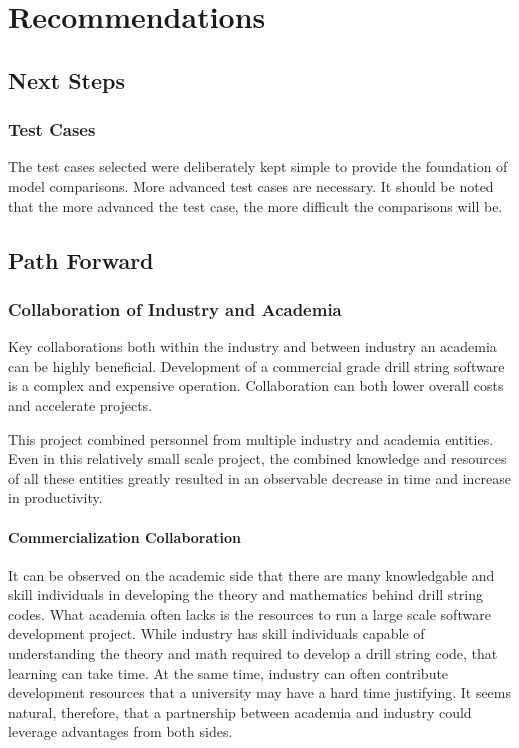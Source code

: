 \chapter{Recommendations}

\section{Next Steps}
\subsection{Test Cases}
The test cases selected were deliberately kept simple to provide the foundation of model comparisons.  More advanced test cases are necessary.  It should be noted that the more advanced the test case, the more difficult the comparisons will be.

\section{Path Forward}
\subsection{Collaboration of Industry and Academia}
Key collaborations both within the industry and between industry an academia can be highly beneficial.  Development of a commercial grade drill string software is a complex and expensive operation.  Collaboration can both lower overall costs and accelerate projects.

This project combined personnel from multiple industry and academia entities.  Even in this relatively small scale project, the combined knowledge and resources of all these entities greatly resulted in an observable decrease in time and increase in productivity.

\subsubsection{Commercialization Collaboration}
It can be observed on the academic side that there are many knowledgable and skill individuals in developing the theory and mathematics behind drill string codes.  What academia often lacks is the resources to run a large scale software development project.  While industry has skill individuals capable of understanding the theory and math required to develop a drill string code, that learning can take time.  At the same time, industry can often contribute development resources that a university may have a hard time justifying.  It seems natural, therefore, that a partnership between academia and industry could leverage advantages from both sides.

